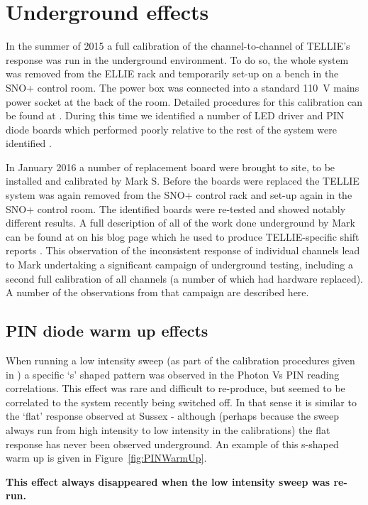 \documentclass[12pt]{report}
\begin{document}
\section{Underground effects}
In the summer of 2015 a full calibration of the channel-to-channel of TELLIE's response was run in the underground environment. To do so, the whole system was removed from the ELLIE rack and temporarily set-up on a bench in the SNO+ control room. The power box was connected into a standard 110~V mains power socket at the back of the room. Detailed procedures for this calibration can be found at \cite{tellieCalibProceedures}. During this time we identified a number of LED driver and PIN diode boards which performed poorly relative to the rest of the system were identified \cite{aug2015CalibSummary}. 

In January 2016 a number of replacement board were brought to site, to be installed and calibrated by Mark S. Before the boards were replaced the TELLIE system was again removed from the SNO+ control rack and set-up again in the SNO+ control room. The identified boards were re-tested and showed notably different results. A full description of all of the work done underground by Mark can be found at on his blog page which he used to produce TELLIE-specific shift reports \cite{StringerBlog}. This observation of the inconsistent response of individual channels lead to Mark undertaking a significant campaign of underground testing, including a second full calibration of all channels (a number of which had hardware replaced). A number of the observations from that campaign are described here.

\subsection{PIN diode warm up effects}
When running a low intensity sweep (as part of the calibration procedures given in \cite{tellieCalibProceedures}) a specific `s' shaped pattern was observed in the Photon Vs PIN reading correlations. This effect was rare and difficult to re-produce, but seemed to be correlated to the system recently being switched off. In that sense it is similar to the `flat' response observed at Sussex - although (perhaps because the sweep always run from high intensity to low intensity in the calibrations) the flat response has never been observed underground. An example of this s-shaped warm up is given in Figure~\ref{fig:PINWarmUp}.

\textbf{This effect always disappeared when the low intensity sweep was re-run.}
\end{document}
